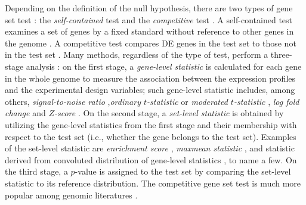 \documentclass[a4,center,fleqn]{NAR}
\begin{document}
	Depending on the definition of the null hypothesis, there are two types of gene set test
	\citep{goeman2007analyzing}: the \textit{self-contained} test and the \textit{competitive} test . A
	self-contained test examines a set of genes by a fixed standard without reference to other genes in
	the genome \citep{goeman2004global,goeman2005testing,tsai2009multivariate,wu2010roast,huang2013gene}. A competitive test compares DE genes in the test set to those not in the test set \citep{tian2005discovering,wu2012camera,yaari2013quantitative}. Many methods, regardless of the type of test, perform a three-stage analysis
	\citep{khatri2012ten}: on the first stage, a \textit{gene-level statistic} is calculated for each
	gene in the whole genome to measure the association between the expression profiles and the
	experimental design variables; such gene-level statistic includes, among others,
	\textit{signal-to-noise ratio} \citep{subramanian2005gene},\textit{ordinary $t$-statistic}
	\citep{tian2005discovering} or \textit{moderated $t$-statistic} \citep{Smyth2004moderated},
	\textit{log fold change} \citep{kim2005page} and \textit{$Z$-score} \citep{efron2007correlation}. On
	the second stage, a \textit{set-level statistic} is obtained by utilizing the gene-level statistics
	from the first stage and their membership with respect to the test set (i.e., whether the gene
	belongs to the test set). Examples of the set-level statistic are \textit{enrichment score}
	\citep{subramanian2005gene}, \textit{maxmean statistic} \citep{efron2007testing}, and statistic
	derived from convoluted distribution of gene-level statistics \citep{yaari2013quantitative}, to name
	a few. On the third stage, a $p$-value is assigned to the test set by comparing the set-level
	statistic to its reference distribution. The competitive gene set test is much more popular among
	genomic literatures \citep{goeman2007analyzing, gatti2010heading}.  
	
	
\end{document}
